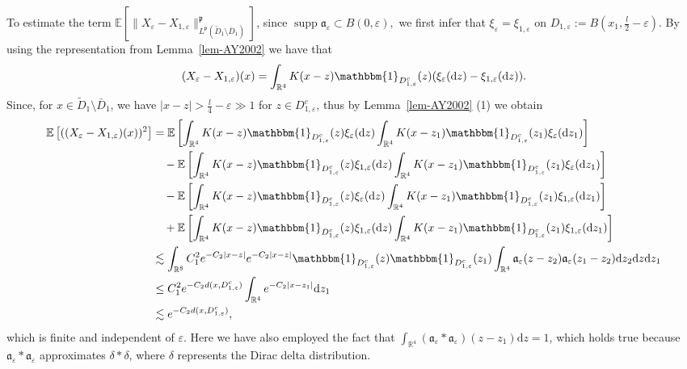 \documentclass{article}
\newcommand{\assign}{:=}
\newcommand{\mathd}{\mathrm{d}}
\newcommand{\tmop}[1]{\ensuremath{\operatorname{#1}}}
\begin{document}
To estimate the term $\mathbb{E} [\| X_{\varepsilon} - X_{1, \varepsilon}
\|_{L^{\mathfrak{p}} (\tilde{D}_1 \setminus \bar{D}_1)}^{\mathfrak{p}}]$,
since $\tmop{supp} \mathfrak{a}_{\varepsilon} \subset B (0, \varepsilon),$ we
first infer that $\xi_{\varepsilon} = \xi_{1, \varepsilon}$ on $D_{1,
\varepsilon} \assign B \left( x_1, \frac{l}{2} - \varepsilon \right)$. By
using the representation from Lemma~\ref{lem-AY2002} we have that
%
\begin{equation}\label{eqn13}
    (X_{\varepsilon} - X_{1, \varepsilon}) (x) = \int_{\mathbb{R}^4} K  (x -
    z) \mathbbm{1}_{D_{1, \varepsilon}^c} (z) (\xi_{\varepsilon} (\mathd z) -
    \xi_{1, \varepsilon} (\mathd z) ) .
\end{equation}
%
Since, for $x \in \tilde{D}_1 \setminus \bar{D}_1$, we have $| x - z | >
\frac{l}{4} - \varepsilon \gg 1$ for $z \in D_{1, \varepsilon}^c$, thus  by
Lemma~\ref{lem-AY2002} (1) we obtain
%
\begin{align*}
     \mathbb{E} \left[((X_{\varepsilon} - X_{1, \varepsilon}) (x))^2 \right] & = \mathbb{E} \left[ \int_{\mathbb{R}^4} K  (x - z) \mathbbm{1}_{D_{1,
     \varepsilon}^c} (z) \xi_{\varepsilon} (\mathd z)  \int_{\mathbb{R}^4} K 
     (x - z_1) \mathbbm{1}_{D_{1, \varepsilon}^c} (z_1) \xi_{\varepsilon}
     (\mathd z_1) \right] \\
     & \quad -\mathbb{E} \left[ \int_{\mathbb{R}^4} K  (x - z) \mathbbm{1}_{D_{1,
     \varepsilon}^c} (z) \xi_{1, \varepsilon} (\mathd z)  \int_{\mathbb{R}^4}
     K  (x - z_1) \mathbbm{1}_{D_{1, \varepsilon}^c} (z_1) \xi_{\varepsilon}
     (\mathd z_1) \right]\\
     & \quad -\mathbb{E} \left[ \int_{\mathbb{R}^4} K  (x - z) \mathbbm{1}_{D_{1,
     \varepsilon}^c} (z) \xi_{\varepsilon} (\mathd z)  \int_{\mathbb{R}^4} K 
     (x - z_1) \mathbbm{1}_{D_{1, \varepsilon}^c} (z_1) \xi_{1, \varepsilon}
     (\mathd z_1) \right]\\
     & \quad +\mathbb{E} \left[ \int_{\mathbb{R}^4} K  (x - z) \mathbbm{1}_{D_{1,
     \varepsilon}^c} (z) \xi_{1, \varepsilon} (\mathd z)  \int_{\mathbb{R}^4}
     K  (x - z_1) \mathbbm{1}_{D_{1, \varepsilon}^c} (z_1) \xi_{1,
     \varepsilon} (\mathd z_1) \right]\\
     & \lesssim \int_{\mathbb{R}^8} C_1^2 {e^{- C_2 | x - z |}}  e^{- C_2 |
     x - z |} \mathbbm{1}_{D_{1, \varepsilon}^c} (z) \mathbbm{1}_{D_{1,
     \varepsilon}^c} (z_1)  \int_{\mathbb{R}^4} \mathfrak{a}_{\varepsilon} (z
     - z_2) \mathfrak{a}_{\varepsilon} (z_1 - z_2) \mathd z_2 \mathd z \mathd
     z_1 \\
     & \leq C_1^2 e^{- C_2 d (x, D_{1, \varepsilon}^c)}
     \int_{\mathbb{R}^4} e^{- C_2 | x - z_1 |} \mathd z_1 \\
     & \lesssim  e^{- C_2 d (x, D_{1, \varepsilon}^c)},
\end{align*}
%
which is finite and independent of $\varepsilon$. Here we have also employed the fact that
$\int_{\mathbb{R}^4} (\mathfrak{a}_{\varepsilon} \ast
\mathfrak{a}_{\varepsilon}) (z - z_1) \mathd z = 1$, which holds true because $\mathfrak{a}_{\varepsilon} \ast \mathfrak{a}_{\varepsilon}$ approximates
$\delta \ast \delta$, where $\delta$ represents the Dirac delta distribution.
\end{document}
